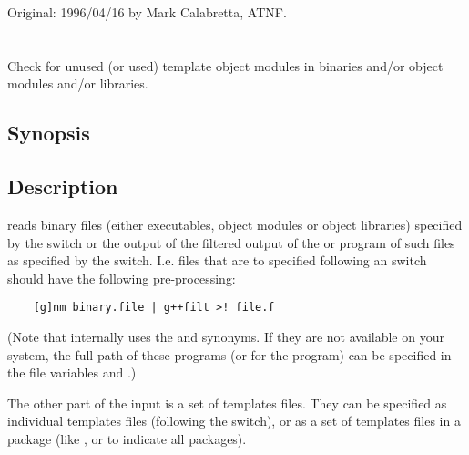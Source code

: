 Original: 1996/04/16 by Mark Calabretta, ATNF.


\newpage
\section{}
\label{unused}

Check for unused (or used) template object modules in binaries and/or object
modules and/or libraries.

\subsection*{Synopsis}

\begin{synopsis}
\end{synopsis}

\subsection*{Description}

 reads binary files (either executables, object modules or object
libraries) specified by the  switch or the output of the
 filtered output of the  or  
program of such files as specified by the  switch. I.e. files that
are to specified following an  switch should have the following
pre-processing: 
\begin{verbatim}
	[g]nm binary.file | g++filt >! file.f
\end{verbatim}
(Note that internally  uses the  and 
synonyms. If they are not available on your system, the full path of these
programs (or for the  program) can be specified in the 
file variables  and .)

The other part of the input is a set of templates files. They can be
specified as individual templates files (following the  switch), or as
a set of templates files in a package (like ,  or
 to indicate all packages).

